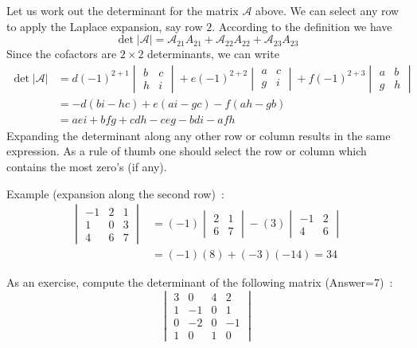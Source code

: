 Let us work out the determinant for the matrix $\mathcal{A}$ above.  We can select any row to apply the Laplace expansion, say row $2$.
According to the definition we have
\[
\det\vert\mathcal{A}\vert=\mathcal{A}_{21}A_{21}+\mathcal{A}_{22}A_{22}+\mathcal{A}_{23}A_{23}
\]
Since the cofactors are $2\times 2$ determinants, we can write
\begin{align}
\det\vert\mathcal{A}\vert&=d(-1)^{2+1}\begin{vmatrix}b&c\\ h&i\end{vmatrix}+e(-1)^{2+2}\begin{vmatrix}a&c\\ g&i\end{vmatrix}+f(-1)^{2+3}\begin{vmatrix}a&b\\ g&h\end{vmatrix}\nonumber\\
&=-d(bi-hc)+e(ai-gc)-f(ah-gb)\nonumber\\
&=aei+bfg+cdh-ceg-bdi-afh\nonumber
\end{align}
Expanding the determinant along any other row or column results in the same expression.  As a rule of thumb one should select the row or 
column which contains the most zero's (if any).  

Example (expansion along the second row)~:
\begin{align}
\begin{vmatrix}-1&2&1\\ 1&0&3\\ 4&6&7\end{vmatrix}&=(-1)\begin{vmatrix}2&1\\ 6&7\end{vmatrix}-(3)\begin{vmatrix}-1&2\\ 4&6\end{vmatrix}\nonumber\\
&=(-1)(8)+(-3)(-14)=34\nonumber
\end{align}

As an exercise, compute the determinant of the following matrix (Answer=7)~:
\[
	\begin{vmatrix} 3 & 0 & 4 & 2\\ 1 & -1 & 0 & 1\\ 0 & -2 & 0 & -1\\ 1 & 0 & 1 & 0\end{vmatrix}
\]


